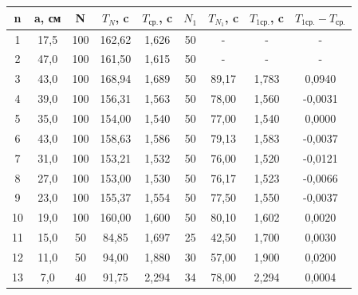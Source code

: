 \documentclass[a4paper, 10pt]{article}%
\begin{document}
\begin{table}[]
\center
\begin{tabular}{|c|c|c|c|c|c|c|c|c|}
\hline
\rowcolor[HTML]{FE0000} 
n  & a, см & N   & $T_{N}$, c & $T_{\text{ср.}}$, c & $N_{1}$ & $T_{N_{1}}$, c & $T_{1\text{ср.}}$, c & $T_{1\text{ср.}}-T_{\text{ср.}}$ \\ \hline
1  & 17,5  & 100 & 162,62     & 1,626               & 50 & -           & -                    & -                                \\ \hline
2  & 47,0  & 100 & 161,50     & 1,615               & 50 & -           & -                    & -                                \\ \hline
3  & 43,0  & 100 & 168,94     & 1,689               & 50 & 89,17       & 1,783                & 0,0940                           \\ \hline
4  & 39,0  & 100 & 156,31     & 1,563               & 50 & 78,00       & 1,560                & -0,0031                          \\ \hline
5  & 35,0  & 100 & 154,00     & 1,540               & 50 & 77,00       & 1,540                & 0,0000                           \\ \hline
6  & 43,0  & 100 & 158,63     & 1,586               & 50 & 79,13       & 1,583                & -0,0037                          \\ \hline
7  & 31,0  & 100 & 153,21     & 1,532               & 50 & 76,00       & 1,520                & -0,0121                          \\ \hline
8  & 27,0  & 100 & 153,00     & 1,530               & 50 & 76,17       & 1,523                & -0,0066                          \\ \hline
9  & 23,0  & 100 & 155,37     & 1,554               & 50 & 77,50       & 1,550                & -0,0037                          \\ \hline
10 & 19,0  & 100 & 160,00     & 1,600               & 50 & 80,10       & 1,602                & 0,0020                           \\ \hline
11 & 15,0  & 50  & 84,85      & 1,697               & 25 & 42,50       & 1,700                & 0,0030                           \\ \hline
12 & 11,0  & 50  & 94,00      & 1,880               & 30 & 57,00       & 1,900                & 0,0200                           \\ \hline
13 & 7,0   & 40  & 91,75      & 2,294               & 34 & 78,00       & 2,294                & 0,0004                           \\ \hline
\end{tabular}
\end{table}
\end{document}
